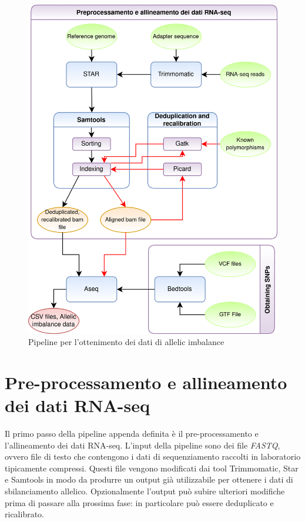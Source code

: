   \begin{figure}[H]
    \label{fig:proj_pipeline}
    \centering
    \includegraphics[scale=0.2]{pipeline.png}
    \caption{Pipeline per l'ottenimento dei dati di allelic imbalance}
  \end{figure}

  \section{Pre-processamento e allineamento dei dati RNA-seq}
  \label{sec:pre_all_rna_seq}
  Il primo passo della pipeline appenda definita \`e il pre-processamento e l'allineamento dei dati RNA-seq.
  L'input della pipeline sono dei file \emph{FASTQ}, ovvero file di testo che contengono i dati di sequenziamento raccolti in laboratorio tipicamente compressi.
  Questi file vengono modificati dai tool Trimmomatic, Star e Samtools in modo da produrre un output gi\`a utilizzabile per ottenere i dati di sbilanciamento allelico.
  Opzionalmente l'output pu\`o subire ulteriori modifiche prima di passare alla prossima fase: in particolare pu\`o essere deduplicato e ricalibrato.

